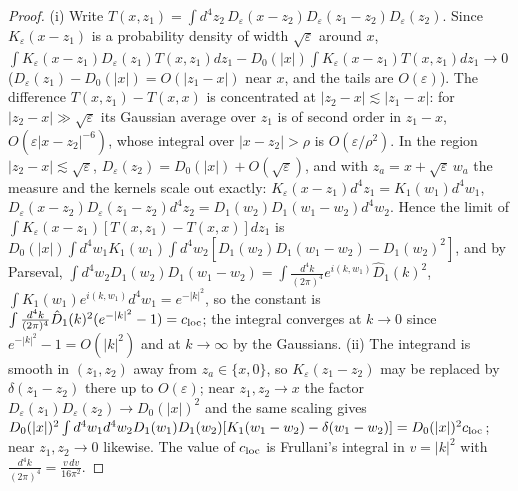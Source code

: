 \documentclass[11pt]{article}
\theoremstyle{plain}
\theoremstyle{definition}
\numberwithin{equation}{section}
\begin{document}
\begin{proof}
(i) Write $T(x,z_1)=\int d^4z_2\,D_\varepsilon(x-z_2)D_\varepsilon(z_1-z_2)D_\varepsilon(z_2)$. Since $K_\varepsilon(x-z_1)$ is a probability density of width $\sqrt\varepsilon$ around $x$, $\int K_\varepsilon(x-z_1)D_\varepsilon(z_1)T(x,z_1)dz_1-D_0(|x|)\int K_\varepsilon(x-z_1)T(x,z_1)dz_1\to0$ ($D_\varepsilon(z_1)-D_0(|x|)=O(|z_1-x|)$ near $x$, and the tails are $O(\varepsilon)$). The difference $T(x,z_1)-T(x,x)$ is concentrated at $|z_2-x|\lesssim|z_1-x|$: for $|z_2-x|\gg\sqrt\varepsilon$ its Gaussian average over $z_1$ is of second order in $z_1-x$, $O(\varepsilon|x-z_2|^{-6})$, whose integral over $|x-z_2|>\rho$ is $O(\varepsilon/\rho^2)$. In the region $|z_2-x|\lesssim\sqrt\varepsilon$, $D_\varepsilon(z_2)=D_0(|x|)+O(\sqrt\varepsilon)$, and with $z_a=x+\sqrt\varepsilon\,w_a$ the measure and the kernels scale out exactly: $K_\varepsilon(x-z_1)d^4z_1=K_1(w_1)d^4w_1$, $D_\varepsilon(x-z_2)D_\varepsilon(z_1-z_2)d^4z_2=D_1(w_2)D_1(w_1-w_2)d^4w_2$. Hence the limit of $\int K_\varepsilon(x-z_1)[T(x,z_1)-T(x,x)]dz_1$ is $D_0(|x|)\int d^4w_1K_1(w_1)\int d^4w_2[D_1(w_2)D_1(w_1-w_2)-D_1(w_2)^2]$, and by Parseval, $\int d^4w_2D_1(w_2)D_1(w_1-w_2)=\int\frac{d^4k}{(2\pi)^4}e^{i(k,w_1)}\hat D_1(k)^2$, $\int K_1(w_1)e^{i(k,w_1)}d^4w_1=e^{-|k|^2}$, so the constant is $\int\frac{d^4k}{(2\pi)^4}\hat D_1(k)^2(e^{-|k|^2}-1)=c_{\rm loc}$; the integral converges at $k\to0$ since $e^{-|k|^2}-1=O(|k|^2)$ and at $k\to\infty$ by the Gaussians. (ii) The integrand is smooth in $(z_1,z_2)$ away from $z_a\in\{x,0\}$, so $K_\varepsilon(z_1-z_2)$ may be replaced by $\delta(z_1-z_2)$ there up to $O(\varepsilon)$; near $z_1,z_2\to x$ the factor $D_\varepsilon(z_1)D_\varepsilon(z_2)\to D_0(|x|)^2$ and the same scaling gives $D_0(|x|)^2\int d^4w_1d^4w_2D_1(w_1)D_1(w_2)[K_1(w_1-w_2)-\delta(w_1-w_2)]=D_0(|x|)^2c_{\rm loc}$; near $z_1,z_2\to0$ likewise. The value of $c_{\rm loc}$ is Frullani's integral in $v=|k|^2$ with $\frac{d^4k}{(2\pi)^4}=\frac{v\,dv}{16\pi^2}$.
\end{proof}
\end{document}
